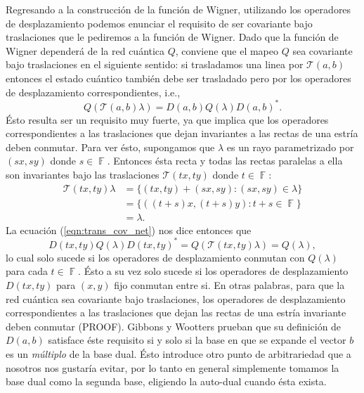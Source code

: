 \documentclass[a4paper]{report}
\DeclareMathOperator{\F}{\mathbb{F}}
\begin{document}
  Regresando a la construcción de la función de Wigner,
  utilizando los operadores de desplazamiento podemos
  enunciar el requisito de ser covariante bajo traslaciones
  que le pediremos a la función de Wigner. Dado que la
  función de Wigner dependerá de la red cuántica $Q$,
  conviene que el mapeo $Q$ sea covariante bajo traslaciones
  en el siguiente sentido: si trasladamos una linea por
  $\mathcal T(a,b)$ entonces el estado cuántico también debe
  ser trasladado pero por los operadores de desplazamiento
  correspondientes, i.e.,
  \begin{equation}
    \label{eqn:trans_cov_net}
    Q(\mathcal T(a,b) \lambda)
    = D(a,b) Q(\lambda) D(a,b)^{*}.
  \end{equation}
  Ésto resulta ser un requisito muy fuerte, ya que implica
  que los operadores correspondientes a las traslaciones que
  dejan invariantes a las rectas de una estría deben
  conmutar. Para ver ésto, supongamos que $\lambda$ es un
  rayo parametrizado por $(sx,sy)$ donde $s \in \F$.
  Entonces ésta recta y todas las rectas paralelas a ella
  son invariantes bajo las traslaciones $\mathcal T(tx,ty)$
  donde $t \in \F$:
  \begin{align*}
    \mathcal T(tx,ty) \lambda
    &= \{(tx,ty) + (sx,sy) : (sx,sy) \in \lambda \} \\
    &= \{((t+s)x, (t+s)y) : t+s \in \F \}\\
    &= \lambda.
  \end{align*} 
  La ecuación (\ref{eqn:trans_cov_net}) nos dice entonces
  que
  \[
    D(tx,ty) Q(\lambda) D(tx,ty)^{*}
    = Q(\mathcal T(tx,ty)\lambda)
    = Q(\lambda),
  \] 
  lo cual solo sucede si los operadores de desplazamiento
  conmutan con $Q(\lambda)$ para cada $t \in \F$.
  Ésto a su vez solo sucede si los operadores de
  desplazamiento $D(tx,ty)$ para $(x,y)$ fijo conmutan entre
  si. En otras palabras, para que la red cuántica sea
  covariante bajo traslaciones, los operadores de
  desplazamiento correspondientes a las traslaciones que
  dejan las rectas de una estría invariante deben conmutar
  (PROOF). Gibbons y Wootters prueban que su definición de
  $D(a,b)$ satisface éste requisito si y solo si la base en
  que se expande el vector $b$ es un \textit{múltiplo} de la
  base dual. Ésto introduce otro punto de arbitrariedad que
  a nosotros nos gustaría evitar, por lo tanto en general
  simplemente tomamos la base dual como la segunda base,
  eligiendo la auto-dual cuando ésta exista.
\end{document}
